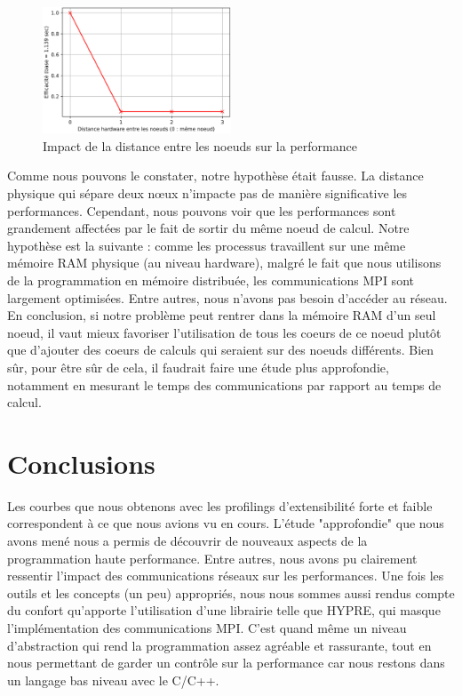 \documentclass[10pt,twocolumn,letterpaper]{article}
\begin{document}
\begin{figure}[H]
    \centering
    \caption{Impact de la distance entre les noeuds sur la performance}
    \includegraphics[width=0.50\textwidth]{fig/dist_profiling.png}
  \end{figure}

Comme nous pouvons le constater, notre hypothèse était fausse. La distance
physique qui sépare deux nœux n'impacte pas de manière significative les
performances. Cependant, nous pouvons voir que les performances sont
grandement affectées par le fait de sortir du même noeud de calcul.
Notre hypothèse est la suivante : comme les processus travaillent sur une
même mémoire RAM physique (au niveau hardware), malgré le fait que nous
utilisons de la programmation en mémoire distribuée, les communications MPI
sont largement optimisées. Entre autres, nous n'avons pas besoin d'accéder
au réseau. En conclusion, si notre problème peut rentrer dans la mémoire RAM
d'un seul noeud, il vaut mieux favoriser l'utilisation de tous les coeurs de
ce noeud plutôt que d'ajouter des coeurs de calculs qui seraient sur des noeuds
différents. Bien sûr, pour être sûr de cela, il faudrait faire une étude plus
approfondie, notamment en mesurant le temps des communications par rapport au
temps de calcul.

\section*{Conclusions}

Les courbes que nous obtenons avec les profilings d'extensibilité forte et
faible correspondent à ce que nous avions vu en cours.
L'étude "approfondie"
que nous avons mené nous a permis de découvrir de nouveaux aspects de la
programmation haute performance. Entre autres, nous avons pu clairement
ressentir l'impact des communications réseaux sur les performances.
Une fois les outils et les concepts (un peu) appropriés, nous nous sommes aussi
rendus compte du confort qu'apporte l'utilisation
d'une librairie telle que HYPRE,
qui masque l'implémentation des communications MPI. C'est quand même un niveau
d'abstraction qui rend la programmation assez agréable et rassurante, tout en
nous permettant de garder un contrôle sur la performance
car nous restons dans un langage bas niveau avec le C/C++.
\end{document}
